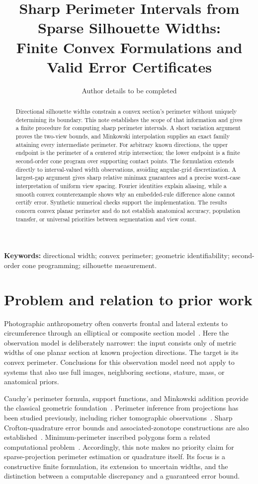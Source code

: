 \documentclass[11pt,a4paper]{article}
\title{Sharp Perimeter Intervals from Sparse Silhouette Widths:\\
Finite Convex Formulations and Valid Error Certificates}
\author{Author details to be completed}
\date{}
\begin{document}
\maketitle

\begin{abstract}
Directional silhouette widths constrain a convex section's perimeter without uniquely determining its boundary. This note establishes the scope of that information and gives a finite procedure for computing sharp perimeter intervals. A short variation argument proves the two-view bounds, and Minkowski interpolation supplies an exact family attaining every intermediate perimeter. For arbitrary known directions, the upper endpoint is the perimeter of a centered strip intersection; the lower endpoint is a finite second-order cone program over supporting contact points. The formulation extends directly to interval-valued width observations, avoiding angular-grid discretization. A largest-gap argument gives sharp relative minimax guarantees and a precise worst-case interpretation of uniform view spacing. Fourier identities explain aliasing, while a smooth convex counterexample shows why an embedded-rule difference alone cannot certify error. Synthetic numerical checks support the implementation. The results concern convex planar perimeter and do not establish anatomical accuracy, population transfer, or universal priorities between segmentation and view count.
\end{abstract}

\noindent\textbf{Keywords:} directional width; convex perimeter; geometric identifiability; second-order cone programming; silhouette measurement.

\section{Problem and relation to prior work}
Photographic anthropometry often converts frontal and lateral extents to circumference through an elliptical or composite section model~\cite{hung,aslam}. Here the observation model is deliberately narrower: the input consists only of metric widths of one planar section at known projection directions. The target is its convex perimeter. Conclusions for this observation model need not apply to systems that also use full images, neighboring sections, stature, mass, or anatomical priors.

Cauchy's perimeter formula, support functions, and Minkowski addition provide the classical geometric foundation~\cite{schneider}. Perimeter inference from projections has been studied previously, including richer tomographic observations~\cite{baudrier}. Sharp Crofton-quadrature error bounds and associated-zonotope constructions are also established~\cite{kiderlen}. Minimum-perimeter inscribed polygons form a related computational problem~\cite{kodmon}. Accordingly, this note makes no priority claim for sparse-projection perimeter estimation or quadrature itself. Its focus is a constructive finite formulation, its extension to uncertain widths, and the distinction between a computable discrepancy and a guaranteed error bound.
\end{document}
